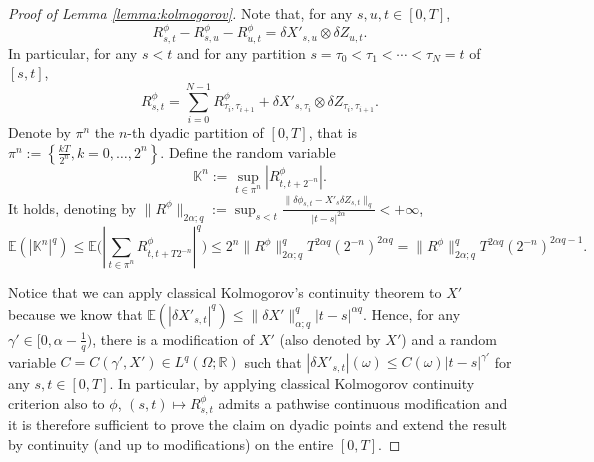 \documentclass[11pt,a4paper]{article}
\newcommand{\R}{\mathbb{R}}
\theoremstyle{plain}
\begin{document}
\begin{appendices}
\begin{proof}[Proof of Lemma \ref{lemma:kolmogorov}]
    Note that, for any $s, u , t \in [0,T]$, \begin{equation*}
        R^{\phi}_{s, t} - R^{\phi}_{s, u} - R^{\phi}_{u, t} = \delta X'_{s, u} \otimes \delta Z_{u, t} .
    \end{equation*}
    In particular, for any $s < t$ and for any partition $s = \tau_0 < \tau_1 < \cdots < \tau_N = t$ of $[s,t]$,
    \begin{equation}
        R^{\phi}_{s, t} = \sum_{i = 0}^{N - 1} R^{\phi}_{\tau_i, \tau_{i + 1}} +
        \delta X'_{s, \tau_i} \otimes \delta Z_{\tau_i, \tau_{i + 1}} .
        \label{eq:additivity}
    \end{equation}
Denote by $\pi^n$ the $n$-th dyadic partition of $[0, T]$, that is $\pi^n
:= \left\{ \frac{k T}{2^n}, k = 0, \ldots, 2^n \right\}$. Define the
random variable
\[ \mathbb{K}^n := \sup_{t \in \pi^n} | R^{\phi}_{t, t + 2^{- n}} | . \]
It holds, denoting by $\| R^{\phi} \|_{2 \alpha ; q} := \sup_{s<t} \frac{\| \delta \phi_{s,t} - X'_s \delta Z_{s,t}\|_q}{|t-s|^{2\alpha}} < +\infty$,
\begin{equation*}
    \mathbb{E} (| \mathbb{K}^n |^q) \le \mathbb{E} \Big( |
  \sum_{t \in \pi^n} R^{\phi}_{t, t + T 2^{- n}} |^q \Big) \le 2^n  \| R^{\phi} \|_{2 \alpha ; q}^q T^{2 \alpha q} (2^{- n})^{2  \alpha q} = \| R^{\phi} \|_{2 \alpha ; q}^q T^{2 \alpha q}  (2^{- n})^{2  \alpha q - 1} . 
\end{equation*}

Notice that we can apply classical Kolmogorov's continuity theorem to $X'$
because we know that $\mathbb{E} (| \delta X'_{s, t} |^q) \leq \| \delta
X' \|_{\alpha ; q}^q | t - s |^{\alpha q}$. 
Hence, for any $\gamma' \in [0, \alpha - \frac{1}{q} )$, there is a modification of $X'$ (also denoted by $X'$) and a random variable $C = C (\gamma', X') \in L^q(\Omega;\R)$ such that $| \delta X'_{s, t} | (\omega) \leq C (\omega) | t - s |^{\gamma'}$ for any $s,t \in [0,T]$. 
In particular, by applying classical Kolmogorov continuity criterion  also to $\phi$,  $(s, t) \mapsto R^{\phi}_{s, t}$ admits a pathwise continuous
modification and it is therefore sufficient to prove the claim on dyadic points and extend the result by continuity (and up to modifications) on the entire $[0, T]$.


\end{proof}
\end{appendices}
\end{document}

